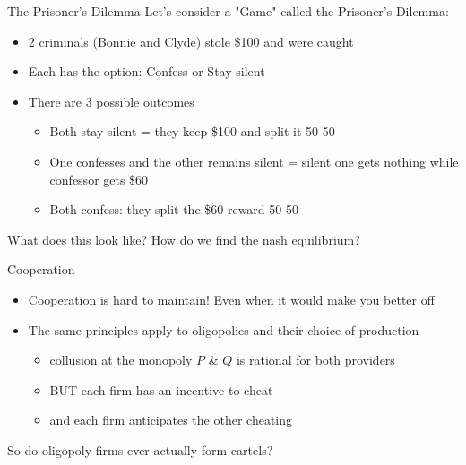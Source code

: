 \documentclass[compress]{beamer}
\begin{document}
\begin{frame}{The Prisoner's Dilemma}
    Let's consider a "Game" called the Prisoner's Dilemma:
    \begin{itemize}
        \item 2 criminals (Bonnie and Clyde) stole \$100 and were caught
        \item Each has the option: Confess or Stay silent
        \item There are 3 possible outcomes
        \begin{itemize}
            \item Both stay silent = they keep \$100 and split it 50-50
            \item One confesses and the other remains silent = silent one gets nothing while confessor gets \$60
            \item Both confess: they split the \$60 reward 50-50
        \end{itemize}
    \end{itemize}
\begin{center}
    What does this look like? How do we find the nash equilibrium?
\end{center}
\end{frame}

\begin{frame}{Cooperation}
    \begin{itemize}
        \item Cooperation is hard to maintain!  \quad Even when it would make you better off
        \item The same principles apply to oligopolies and their choice of production
        \begin{itemize}
            \item collusion at the monopoly $P$ \& $Q$ is rational for both providers
            \item BUT each firm has an incentive to cheat
            \item and each firm anticipates the other cheating
        \end{itemize}
    \end{itemize}



\vspace{1cm}
    \begin{center}
    So do oligopoly firms ever actually form cartels?
    \end{center}
\end{frame}
\end{document}
